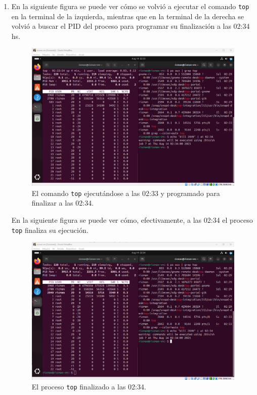 \documentclass[12pt]{article}
\begin{document}
\begin{enumerate}[1.]
    \item En la siguiente figura se puede ver cómo se volvió a ejecutar el comando \verb|top| en la terminal de la izquierda, mientras que en la terminal de la derecha se volvió a buscar el PID del proceso para programar su finalización a las 02:34 hs.
      \begin{figure}[H]
        \centering
        \includegraphics[width=\linewidth]{../imagenes/top-corriendo-at.png}
        \caption{El comando \texttt{top} ejecutándose a las 02:33 y programado para finalizar a las 02:34.}
        \label{top-corriendo-at}
      \end{figure}

      En la siguiente figura se puede ver cómo, efectivamente, a las 02:34 el proceso \verb|top| finaliza su ejecución.
      \begin{figure}[H]
        \centering
        \includegraphics[width=\linewidth]{../imagenes/top-parado-at.png}
	\caption{El proceso \texttt{top} finalizado a las 02:34.}
        \label{top-parado-at}
      \end{figure}
  \end{enumerate}
\end{document}
